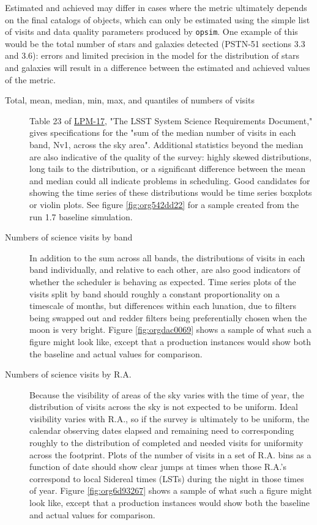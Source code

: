 Estimated and achieved may differ in cases where the metric ultimately depends on the final catalogs of objects, which can only be estimated using the simple list of visits and data quality parameters produced by \texttt{opsim}.
One example of this would be the total number of stars and galaxies detected (PSTN-51 sections 3.3 and 3.6): errors and limited precision in the model for the distribution of stars and galaxies will result in a difference between the estimated and achieved values of the metric.

\begin{description}
\item[{Total, mean, median, min, max, and quantiles of numbers of visits}] Table 23 of \href{http://ls.st/lpm-17}{LPM-17}, "The LSST System Science Requirements Document," gives specifications for the "sum of the median number of visits in each band, Nv1, across the sky area". Additional statistics beyond the median are also indicative of the quality of the survey: highly skewed distributions, long tails to the distribution, or a significant difference between the mean and median could all indicate problems in scheduling. Good candidates for showing the time series of these distributions would be time series boxplots or violin plots. See figure \ref{fig:org542dd22} for a sample created from the run 1.7 baseline simulation.
\item[{Numbers of science visits by band}] In addition to the sum across all bands, the distributions of visits in each band individually, and relative to each other, are also good indicators of whether the scheduler is behaving as expected. Time series plots of the visits split by band should roughly a constant proportionality on a timescale of months, but differences within each lunation, due to filters being swapped out and redder filters being preferentially chosen when the moon is very bright. Figure \ref{fig:orgdac0069} shows a sample of what such a figure might look like, except that a production instances would show both the baseline and actual values for comparison.
\item[{Numbers of science visits by R.A.}] Because the visibility of areas of the sky varies with the time of year, the distribution of visits across the sky is not expected to be uniform. Ideal visibility varies with R.A., so if the survey is ultimately to be uniform, the calendar observing dates elapsed and remaining need to corresponding roughly to the distribution of completed and needed visits for uniformity across the footprint. Plots of the number of visits in a set of R.A. bins as a function of date should show clear jumps at times when those R.A.'s correspond to local Sidereal times (LSTs) during the night in those times of year. Figure \ref{fig:org6d93267} shows a sample of what such a figure might look like, except that a production instances would show both the baseline and actual values for comparison.

\end{description}
